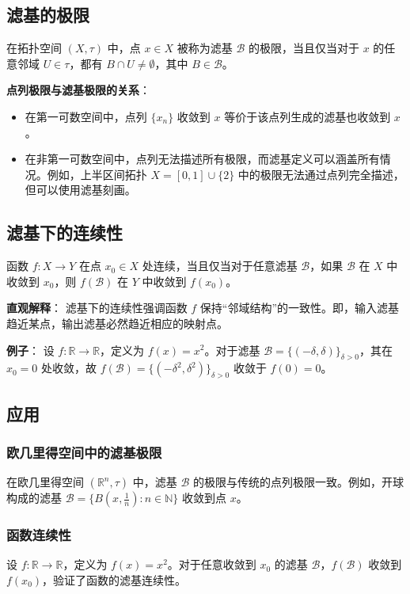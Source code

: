 \documentclass[a4paper, oneside]{article}
\begin{document}
\subsection{滤基的极限}
在拓扑空间 $(X, \tau)$ 中，点 $x \in X$ 被称为滤基 $\mathcal{B}$ 的极限，当且仅当对于 $x$ 的任意邻域 $U \in \tau$，都有 $B \cap U \neq \emptyset$，其中 $B \in \mathcal{B}$。

\textbf{点列极限与滤基极限的关系}：
\begin{itemize}
    \item 在第一可数空间中，点列 $\{x_n\}$ 收敛到 $x$ 等价于该点列生成的滤基也收敛到 $x$。
    \item 在非第一可数空间中，点列无法描述所有极限，而滤基定义可以涵盖所有情况。例如，上半区间拓扑 \( X = [0,1] \cup \{2\} \) 中的极限无法通过点列完全描述，但可以使用滤基刻画。
\end{itemize}

\subsection{滤基下的连续性}
函数 $f: X \to Y$ 在点 $x_0 \in X$ 处连续，当且仅当对于任意滤基 $\mathcal{B}$，如果 $\mathcal{B}$ 在 $X$ 中收敛到 $x_0$，则 $f(\mathcal{B})$ 在 $Y$ 中收敛到 $f(x_0)$。

\textbf{直观解释}：
滤基下的连续性强调函数 $f$ 保持“邻域结构”的一致性。即，输入滤基趋近某点，输出滤基必然趋近相应的映射点。

\textbf{例子}：
设 $f: \mathbb{R} \to \mathbb{R}$，定义为 $f(x) = x^2$。对于滤基 $\mathcal{B} = \{(-\delta, \delta)\}_{\delta > 0}$，其在 $x_0 = 0$ 处收敛，故 $f(\mathcal{B}) = \{(-\delta^2, \delta^2)\}_{\delta > 0}$ 收敛于 $f(0) = 0$。

\subsection{应用}
\subsubsection{欧几里得空间中的滤基极限}
在欧几里得空间 $(\mathbb{R}^n, \tau)$ 中，滤基 $\mathcal{B}$ 的极限与传统的点列极限一致。例如，开球构成的滤基 $\mathcal{B} = \{B(x, \frac{1}{n}) : n \in \mathbb{N}\}$ 收敛到点 $x$。
\subsubsection{函数连续性}
设 $f: \mathbb{R} \to \mathbb{R}$，定义为 $f(x) = x^2$。对于任意收敛到 $x_0$ 的滤基 $\mathcal{B}$，$f(\mathcal{B})$ 收敛到 $f(x_0)$，验证了函数的滤基连续性。
\end{document}
